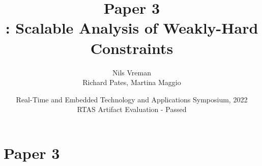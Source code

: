 \section{Paper 3}

\title[PhD Defence]{
    {\Huge Paper 3} \\
    \vspace{2mm}
    {\Large \tool{}: Scalable Analysis of Weakly-Hard Constraints} \\
}
\author[Nils Vreman]{
    Nils Vreman \\
    \vspace{3mm}
    {\large Richard Pates, Martina Maggio}
}
\date[RTAS 2022]{
    Real-Time and Embedded Technology and Applications Symposium, 2022\\
    {\large RTAS Artifact Evaluation - Passed}
}
\notitlelogo
{}


